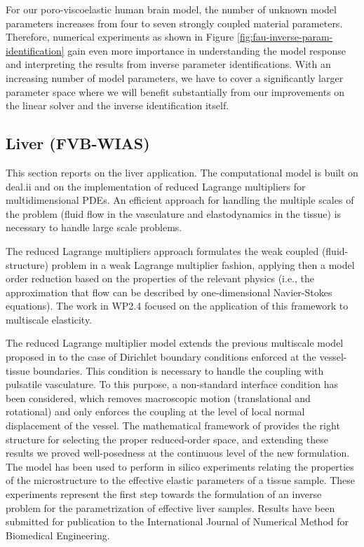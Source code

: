 \documentclass[a4paper,12pt]{article}
\begin{document}
For our poro-viscoelastic human brain model, the number of unknown model parameters increases from four to seven strongly coupled material parameters. Therefore, numerical experiments as shown in Figure \ref{fig:fau-inverse-param-identification} gain even more importance in understanding the model response and interpreting the results from inverse parameter identifications. With an increasing number of model parameters, we have to cover a significantly larger parameter space where we will benefit substantially from our improvements on the linear solver and the inverse identification itself.

\subsection{Liver (FVB-WIAS)}

This section reports on the liver application. The computational model is built on deal.ii and on the implementation of reduced Lagrange multipliers for multidimensional PDEs. An efficient approach for handling the multiple scales of the problem (fluid flow in the vasculature and elastodynamics in the tissue) is necessary to handle large scale problems.

The reduced Lagrange multipliers approach \cite{heltai2023reduced} formulates the weak coupled (fluid-structure) problem in a weak Lagrange multiplier fashion, applying then a model order reduction based on the properties of the relevant physics (i.e., the approximation that flow can be described by one-dimensional Navier-Stokes equations). The work in WP2.4 focused on the application of this framework to multiscale elasticity.

The reduced Lagrange multiplier  model extends the previous multiscale model proposed in \cite{heltai2019multiscale} to the case of Dirichlet boundary conditions enforced at the vessel-tissue boundaries. This condition is necessary to handle the coupling with pulsatile vasculature. To this purpose, a non-standard interface condition has been considered, which removes macroscopic motion (translational and rotational) and only enforces the coupling at the level of local normal displacement of the vessel. The mathematical framework of \cite{heltai2023reduced} provides the right structure for selecting the proper reduced-order space, and extending these results we proved well-posedness at the continuous level of the new formulation. The model has been used to perform in silico experiments relating the properties of the microstructure to the effective elastic parameters of a tissue sample. These experiments represent the first step towards the formulation of an inverse problem for the parametrization of effective liver samples. Results have been submitted for publication to the International Journal of Numerical Method for Biomedical Engineering.
\end{document}
